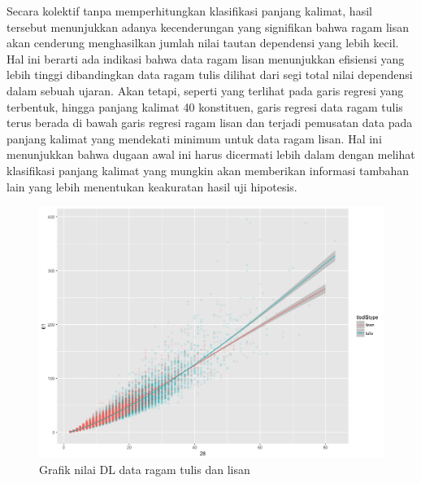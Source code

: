 Secara kolektif tanpa memperhitungkan klasifikasi panjang kalimat, hasil tersebut menunjukkan adanya kecenderungan yang signifikan bahwa ragam lisan akan cenderung menghasilkan jumlah nilai tautan dependensi yang lebih kecil. Hal ini berarti ada indikasi bahwa data ragam lisan menunjukkan efisiensi yang lebih tinggi dibandingkan data ragam tulis dilihat dari segi total nilai dependensi dalam sebuah ujaran. Akan tetapi, seperti yang terlihat pada garis regresi yang terbentuk, hingga panjang kalimat 40 konstituen, garis regresi data ragam tulis terus berada di bawah garis regresi ragam lisan dan terjadi pemusatan data pada panjang kalimat yang mendekati minimum untuk data ragam lisan. Hal ini menunjukkan bahwa dugaan awal ini harus dicermati lebih dalam dengan melihat klasifikasi panjang kalimat yang mungkin akan memberikan informasi tambahan lain yang lebih menentukan keakuratan hasil uji hipotesis. 

\begin{figure}
	\centering \includegraphics[width=1
	\textwidth] {pics/lisantulis_DL.png} 
	\caption{Grafik nilai DL data ragam tulis dan lisan} 
\label{fig:lisantulis_DL} 
\end{figure}

